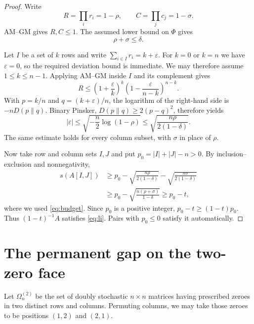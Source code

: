\documentclass[11pt]{article}
\theoremstyle{remark}
\begin{document}
\begin{proof}
Write
\[
 R=\prod_i r_i=1-\rho,
 \qquad
 C=\prod_j c_j=1-\sigma.
\]
AM--GM gives $R,C\le1$.  The assumed lower bound on $\Phi$ gives
\begin{equation}\label{eq:budget}
 \rho+\sigma\le\delta.
\end{equation}

Let $I$ be a set of $k$ rows and write
$\sum_{i\in I}r_i=k+\varepsilon$.  For $k=0$ or $k=n$ we have
$\varepsilon=0$, so the required deviation bound is immediate.  We may
therefore assume $1\le k\le n-1$.  Applying AM--GM inside $I$ and its
complement gives
\[
 R\le\left(1+\frac{\varepsilon}{k}\right)^k
       \left(1-\frac{\varepsilon}{n-k}\right)^{n-k}.
\]
With $p=k/n$ and $q=(k+\varepsilon)/n$, the logarithm of the right-hand side
is $-nD(p\|q)$.  Binary Pinsker, $D(p\|q)\ge2(p-q)^2$, therefore yields
\[
 |\varepsilon|
 \le \sqrt{-\frac n2\log(1-\rho)}
 \le \sqrt{\frac{n\rho}{2(1-\delta)}}.
\]
The same estimate holds for every column subset, with $\sigma$ in place of
$\rho$.

Now take row and column sets $I,J$ and put
$p_0=|I|+|J|-n>0$.  By inclusion--exclusion and nonnegativity,
\begin{align*}
 s(A[I,J])
 &\ge p_0
 -\sqrt{\frac{n\rho}{2(1-\delta)}}
 -\sqrt{\frac{n\sigma}{2(1-\delta)}}\\
 &\ge p_0-\sqrt{\frac{n(\rho+\sigma)}{1-\delta}}
 \ge p_0-t,
\end{align*}
where we used \eqref{eq:budget}.  Since $p_0$ is a positive integer,
$p_0-t\ge(1-t)p_0$.  Thus $(1-t)^{-1}A$ satisfies \eqref{eq:li}.  Pairs with
$p_0\le0$ satisfy it automatically.
\end{proof}

\section{The permanent gap on the two-zero face}

Let $\Omega_n^{(2)}$ be the set of doubly stochastic $n\times n$ matrices
having prescribed zeroes in two distinct rows and columns.  Permuting columns,
we may take those zeroes to be positions $(1,2)$ and $(2,1)$.
\end{document}
